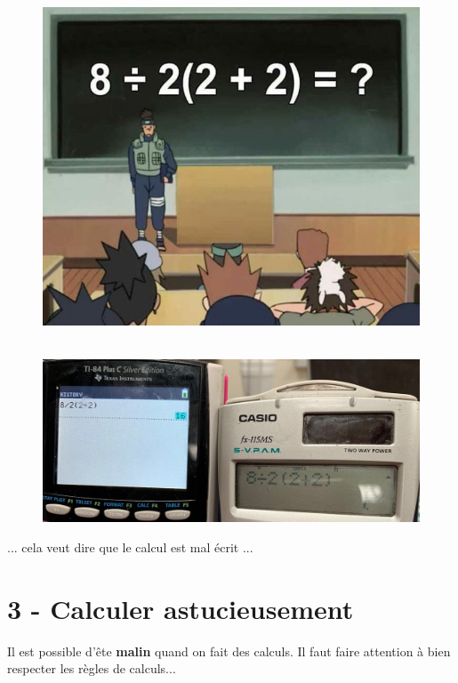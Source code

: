 \documentclass[11pt]{article}
\begin{document}
\begin{minipage}[t]{0.5\textwidth}
  \begin{figure}[H]
        \centering
        \includegraphics[width=0.7\linewidth]{5x1-calculer-et-rediger-des-calculs/naruto.png}
  \end{figure}
\end{minipage}
\begin{minipage}[t]{0.5\textwidth}
  \begin{figure}[H]
        \centering
        \includegraphics[width=\linewidth]{5x1-calculer-et-rediger-des-calculs/calc.png}
  \end{figure}
... cela veut dire que le calcul est mal écrit ...
\end{minipage}


\section*{3 - Calculer astucieusement}

Il est possible d'ête \textbf{malin} quand on fait des calculs. Il faut faire attention à bien respecter les règles de calculs...
\end{document}
